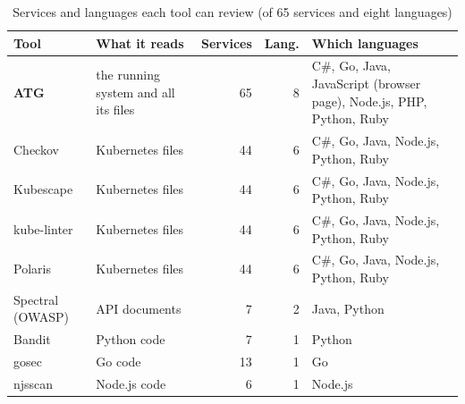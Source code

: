 \documentclass[conference]{IEEEtran}
\begin{document}
\begin{table}[!htbp]
\caption{Services and languages each tool can review (of 65 services and eight languages)}
\label{tab:langs}
\centering
\scriptsize
\setlength{\tabcolsep}{2.5pt}
\begin{tabular}{@{}>{\raggedright\arraybackslash}p{1.35cm}>{\raggedright\arraybackslash}p{1.5cm}rr>{\raggedright\arraybackslash}p{2.75cm}@{}}
\toprule
Tool & What it reads & Services & Lang. & Which languages \\
\midrule
\textbf{ATG} & the running system and all its files & 65 & 8 & C\#, Go, Java, JavaScript (browser page), Node.js, PHP, Python, Ruby \\
Checkov & Kubernetes files & 44 & 6 & C\#, Go, Java, Node.js, Python, Ruby \\
Kubescape & Kubernetes files & 44 & 6 & C\#, Go, Java, Node.js, Python, Ruby \\
kube-linter & Kubernetes files & 44 & 6 & C\#, Go, Java, Node.js, Python, Ruby \\
Polaris & Kubernetes files & 44 & 6 & C\#, Go, Java, Node.js, Python, Ruby \\
Spectral (OWASP) & API documents & 7 & 2 & Java, Python \\
Bandit & Python code & 7 & 1 & Python \\
gosec & Go code & 13 & 1 & Go \\
njsscan & Node.js code & 6 & 1 & Node.js \\
\bottomrule
\end{tabular}
\end{table}
\end{document}
